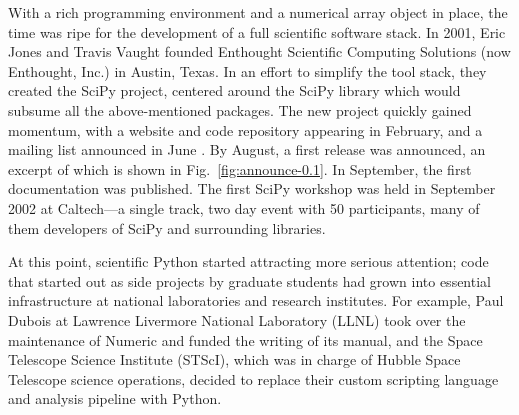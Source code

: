 \documentclass[fleqn,10pt]{wlscirep}
\begin{document}
With a rich programming environment and a numerical array object in
place, the time was ripe for the development of a full scientific
software stack.
In 2001, Eric Jones and Travis Vaught founded Enthought Scientific
Computing Solutions (now Enthought, Inc.) in Austin, Texas.  In an
effort to simplify the tool stack, they created the SciPy project,
centered around the SciPy library which would subsume all the
above-mentioned packages.
The new project quickly gained momentum, with a website and code
repository appearing in
February\cite{archived-scipyorg}, and
a mailing list announced in
June \cite{new-scipy-list}. By
August, a first release was announced\cite{first-scipy-rel}, an excerpt of which is shown in
Fig.~\ref{fig:announce-0.1}.
In September, the first documentation was
published\cite{first-scipy-docs}.
The first SciPy
workshop\cite{first-scipy-workshop}
was held in September 2002 at Caltech---a single track, two day event with 50
participants, many of them developers of SciPy and surrounding libraries.



At this point, scientific Python started attracting more serious attention;
code that started out as side projects by graduate students had grown into
essential infrastructure at national laboratories and research institutes.
For example, Paul Dubois at Lawrence Livermore National Laboratory (LLNL) took over the
maintenance of Numeric and funded the writing of its
manual\cite{Numeric-manual}, and
the Space Telescope Science Institute (STScI), which was in charge of
Hubble Space Telescope science operations, decided to replace their
custom scripting language and analysis pipeline with Python\cite{STScI-slither}.
\end{document}
